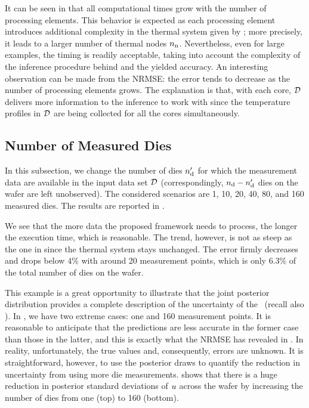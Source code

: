 It can be seen in  that all computational times grow with the number of processing elements. This behavior is expected as each processing element introduces additional complexity in the thermal system given by ; more precisely, it leads to a larger number of thermal nodes ${n_\text{n}}$. Nevertheless, even for large examples, the timing is readily acceptable, taking into account the complexity of the inference procedure behind and the yielded accuracy.
An interesting observation can be made from the NRMSE: the error tends to decrease as the number of processing elements grows. The explanation is that, with each core, $\mathcal{D}$ delivers more information to the inference to work with since the temperature profiles in $\mathcal{D}$ are being collected for all the cores simultaneously.

\subsection{Number of Measured Dies}

In this subsection, we change the number of dies ${n_\text{d}'}$ for which the measurement data are available in the input data set $\mathcal{D}$ (correspondingly, ${n_\text{d}} - {n_\text{d}'}$ dies on the wafer are left unobserved). The considered scenarios are 1, 10, 20, 40, 80, and 160 measured dies. The results are reported in .


We see that the more data the proposed framework needs to process, the longer the execution time, which is reasonable. The trend, however, is not as steep as the one in  since the thermal system stays unchanged.
The error firmly decreases and drops below $4\%$ with around 20 measurement points, which is only $6.3\%$ of the total number of dies on the wafer.


This example is a great opportunity to illustrate that the joint posterior distribution provides a complete description of the uncertainty of the \qoi\ (recall also ). In , we have two extreme cases: one and 160 measurement points. It is reasonable to anticipate that the predictions are less accurate in the former case than those in the latter, and this is exactly what the NRMSE has revealed in . In reality, unfortunately, the true values and, consequently, errors are unknown.
It is straightforward, however, to use the posterior draws to quantify the reduction in uncertainty from using more die measurements.  shows that there is a huge reduction in posterior standard deviations of $u$ across the wafer by increasing the number of dies from one (top) to 160 (bottom).

